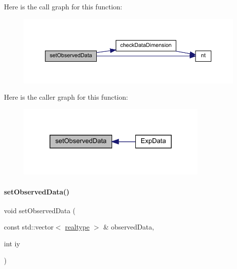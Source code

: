 Here is the call graph for this function\+:
\nopagebreak
\begin{figure}[H]
\begin{center}
\leavevmode
\includegraphics[width=350pt]{classamici_1_1_exp_data_a85ca23791c279fe94e5d9f8e528ca63e_cgraph}
\end{center}
\end{figure}
Here is the caller graph for this function\+:
\nopagebreak
\begin{figure}[H]
\begin{center}
\leavevmode
\includegraphics[width=264pt]{classamici_1_1_exp_data_a85ca23791c279fe94e5d9f8e528ca63e_icgraph}
\end{center}
\end{figure}
\mbox{\label{classamici_1_1_exp_data_a814827d61da6c675276758c856faf794}} 
\paragraph{\texorpdfstring{set\+Observed\+Data()}{setObservedData()}\hspace{0.1cm}{\footnotesize\ttfamily [2/2]}}
{\footnotesize\ttfamily void set\+Observed\+Data (\begin{DoxyParamCaption}\item[{const std\+::vector$<$ \mbox{\hyperlink{namespaceamici_a1bdce28051d6a53868f7ccbf5f2c14a3}{realtype}} $>$ \&}]{observed\+Data,  }\item[{int}]{iy }\end{DoxyParamCaption})}


